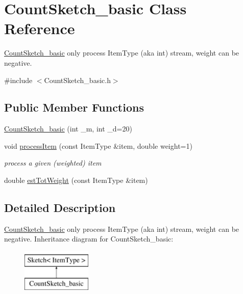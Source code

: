 \hypertarget{classCountSketch__basic}{}\section{Count\+Sketch\+\_\+basic Class Reference}
\label{classCountSketch__basic}


\hyperlink{classCountSketch__basic}{Count\+Sketch\+\_\+basic} only process Item\+Type (aka int) stream, weight can be negative.  




{\ttfamily \#include $<$Count\+Sketch\+\_\+basic.\+h$>$}

\subsection*{Public Member Functions}
\begin{DoxyCompactItemize}
\item 
\hyperlink{classCountSketch__basic_ace66ec874475371b17f3198fa58f4a64}{Count\+Sketch\+\_\+basic} (int \+\_\+m, int \+\_\+d=20)
\item 
void \hyperlink{classCountSketch__basic_a0b04a877b096e34e3f924ff4db7b364d}{process\+Item} (const Item\+Type \&item, double weight=1)\hypertarget{classCountSketch__basic_a0b04a877b096e34e3f924ff4db7b364d}{}\label{classCountSketch__basic_a0b04a877b096e34e3f924ff4db7b364d}

\begin{DoxyCompactList}\small\item\em process a given (weighted) item \end{DoxyCompactList}\item 
double \hyperlink{classCountSketch__basic_a39969d1f299e61c5c69d8e80bf0f6046}{est\+Tot\+Weight} (const Item\+Type \&item)
\end{DoxyCompactItemize}


\subsection{Detailed Description}
\hyperlink{classCountSketch__basic}{Count\+Sketch\+\_\+basic} only process Item\+Type (aka int) stream, weight can be negative. Inheritance diagram for Count\+Sketch\+\_\+basic\+:\begin{figure}[H]
\begin{center}
\leavevmode
\includegraphics[height=2.000000cm]{classCountSketch__basic}
\end{center}
\end{figure}


